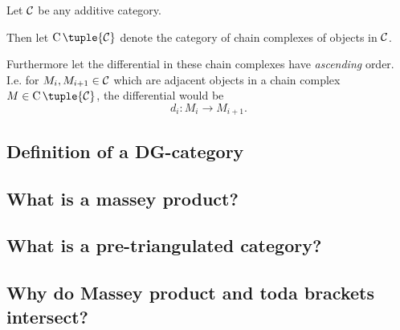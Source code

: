 \begin{notation}
    Let \( {\mathcal{C}} \) be any additive category.
    
    Then let \( \C \tuple{\Cc} \) denote the category of chain complexes of objects in \( {\mathcal{C}} \).

    Furthermore let the differential in these chain complexes have \emph{ascending} order. I.e. for \( M_i, M_{i+1} \in {\mathcal{C}} \) which are adjacent objects in a chain complex \( M \in \C \tuple{\Cc} \), the differential would be
    \[
        d_i : M_i \to M_{i + 1}.
    \]
\end{notation}

\subsection{Definition of a DG-category}


\subsection{What is a massey product?}


\subsection{What is a pre-triangulated category?}


\subsection{Why do Massey product and toda brackets intersect?}

